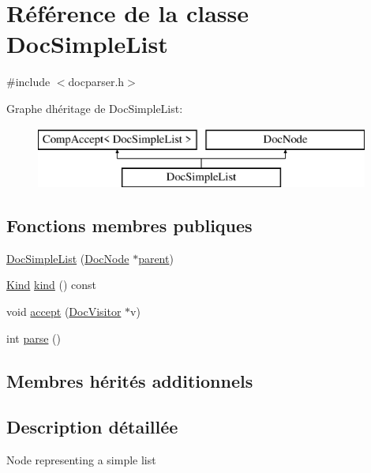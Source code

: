 \hypertarget{class_doc_simple_list}{}\section{Référence de la classe Doc\+Simple\+List}
\label{class_doc_simple_list}


{\ttfamily \#include $<$docparser.\+h$>$}

Graphe d\textquotesingle{}héritage de Doc\+Simple\+List\+:\begin{figure}[H]
\begin{center}
\leavevmode
\includegraphics[height=2.000000cm]{class_doc_simple_list}
\end{center}
\end{figure}
\subsection*{Fonctions membres publiques}
\begin{DoxyCompactItemize}
\item 
\hyperlink{class_doc_simple_list_ad03cfb668ac8e84652be8d254b751a85}{Doc\+Simple\+List} (\hyperlink{class_doc_node}{Doc\+Node} $\ast$\hyperlink{class_doc_node_a990d8b983962776a647e6231d38bd329}{parent})
\item 
\hyperlink{class_doc_node_aebd16e89ca590d84cbd40543ea5faadb}{Kind} \hyperlink{class_doc_simple_list_a997bd62a35be538fb085aaf0a124a964}{kind} () const 
\item 
void \hyperlink{class_doc_simple_list_a764781c073f3b4a6dd4d3b28a8a5c971}{accept} (\hyperlink{class_doc_visitor}{Doc\+Visitor} $\ast$v)
\item 
int \hyperlink{class_doc_simple_list_a0b7395b31b97e5d5a4acd5f74a778cf1}{parse} ()
\end{DoxyCompactItemize}
\subsection*{Membres hérités additionnels}


\subsection{Description détaillée}
Node representing a simple list 


